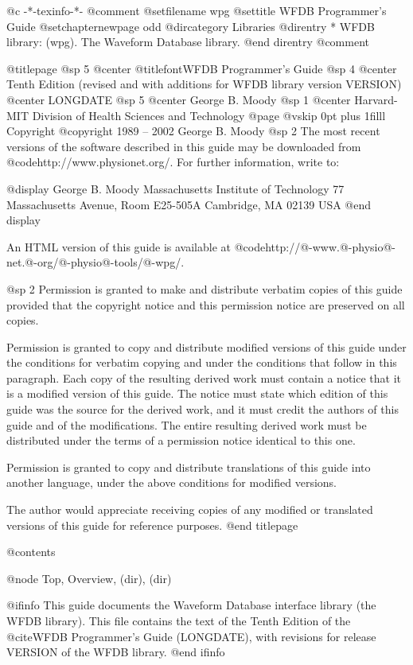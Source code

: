 	@c -*-texinfo-*-
@comment %
@setfilename wpg
@settitle WFDB Programmer's Guide
@setchapternewpage odd
@dircategory Libraries
@direntry
* WFDB library: (wpg).		The Waveform Database library.
@end direntry
@comment %

@titlepage
@sp 5
@center @titlefont{WFDB Programmer's Guide}
@sp 4
@center Tenth Edition (revised and with additions for WFDB library version VERSION)
@center LONGDATE
@sp 5
@center George B. Moody
@sp 1
@center Harvard-MIT Division of Health Sciences and Technology
@page
@vskip 0pt plus 1filll
Copyright @copyright{} 1989 -- 2002 George B. Moody
@sp 2
The most recent versions of the software described in this guide may be
downloaded from @code{http://www.physionet.org/}.  For further
information, write to:

@display
George B. Moody
Massachusetts Institute of Technology
77 Massachusetts Avenue, Room E25-505A
Cambridge, MA 02139
USA
@end display

An HTML version of this guide is available at
@code{http://@-www.@-physio@-net.@-org/@-physio@-tools/@-wpg/}.

@sp 2
Permission is granted to make and distribute verbatim copies of this
guide provided that the copyright notice and this permission notice are
preserved on all copies.

Permission is granted to copy and distribute modified versions of this
guide under the conditions for verbatim copying and under the conditions
that follow in this paragraph.  Each copy of the resulting derived work
must contain a notice that it is a modified version of this guide.  The
notice must state which edition of this guide was the source for the derived
work, and it must credit the authors of this guide and of the
modifications.  The entire resulting derived work must be distributed
under the terms of a permission notice identical to this one.

Permission is granted to copy and distribute translations of this guide
into another language, under the above conditions for modified versions.

The author would appreciate receiving copies of any modified or
translated versions of this guide for reference purposes.
@end titlepage

@contents

@node Top, Overview, (dir), (dir)

@ifinfo
This guide documents the Waveform Database interface library (the WFDB
library).  This file contains the text of the Tenth Edition of
the @cite{WFDB Programmer's Guide} (LONGDATE), with
revisions for release VERSION of the WFDB library.
@end ifinfo

